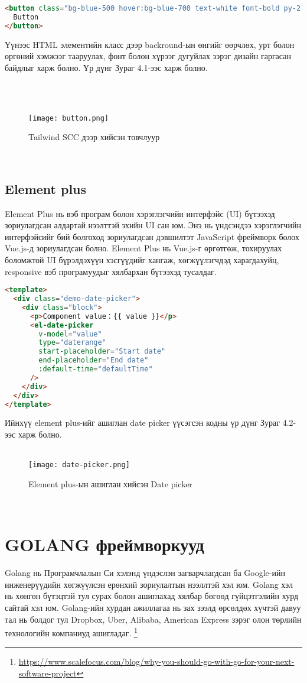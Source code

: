 \begin{lstlisting}[language=HTML, caption=TailwindCSS framework-ийн жишээ, frame=single]
<button class="bg-blue-500 hover:bg-blue-700 text-white font-bold py-2 px-4 rounded">
  Button
</button>
\end{lstlisting}

Үүнээс HTML элементийн класс дээр backround-ын өнгийг өөрчлөх, урт болон өргөний хэмжээг тааруулах, фонт болон хүрээг дугуйлах зэрэг дизайн гаргасан байдлыг харж болно. Үр дүнг Зураг 4.1-ээс харж болно.

\\\
\begin{figure}[H]
\texttt{[image: button.png]}
\caption{Tailwind SCC дээр хийсэн товчлуур}
\end{figure}
\\

\subsection{Element plus}
Element Plus нь вэб програм болон хэрэглэгчийн интерфэйс (UI) бүтээхэд зориулагдсан алдартай нээлттэй эхийн UI сан юм. Энэ нь үндсэндээ хэрэглэгчийн интерфэйсийг бий болгоход зориулагдсан дэвшилтэт JavaScript фреймворк болох Vue.js-д зориулагдсан болно. Element Plus нь Vue.js-г өргөтгөж, тохируулах боломжтой UI бүрэлдэхүүн хэсгүүдийг хангаж, хөгжүүлэгчдэд харагдахуйц, responsive вэб програмуудыг хялбархан бүтээхэд тусалдаг.

\begin{lstlisting}[language=HTML, caption=TailwindCSS framework-ийн жишээ, frame=single]
<template>
  <div class="demo-date-picker">
    <div class="block">
      <p>Component value：{{ value }}</p>
      <el-date-picker
        v-model="value"
        type="daterange"
        start-placeholder="Start date"
        end-placeholder="End date"
        :default-time="defaultTime"
      />
    </div>
  </div>
</template>
\end{lstlisting}
Ийнхүү element plus-ийг ашиглан date picker үүсэгсэн кодны үр дүнг Зураг 4.2-ээс харж болно.
\\\
\begin{figure}[H]
\texttt{[image: date-picker.png]}
\caption{Element plus-ын ашиглан хийсэн Date picker}
\end{figure}
\\

\section{GOLANG фреймворкууд}
Golang нь Програмчлалын Си хэлэнд үндэслэн загварчлагдсан ба Google-ийн инженерүүдийн хөгжүүлсэн ерөнхий зориулалтын нээллтэй хэл юм. Golang хэл нь хөнгөн бүтэцтэй тул сурах болон ашиглахад хялбар бөгөөд гүйцэтгэлийн хурд сайтай хэл юм. Golang-ийн хурдан ажиллагаа нь зах зээлд өрсөлдөх хүчтэй давуу тал нь болдог тул Dropbox, Uber, Alibaba, American Express зэрэг олон төрлийн технологийн компаниуд ашигладаг. \footnote{\url{https://www.scalefocus.com/blog/why-you-should-go-with-go-for-your-next-software-project}}


